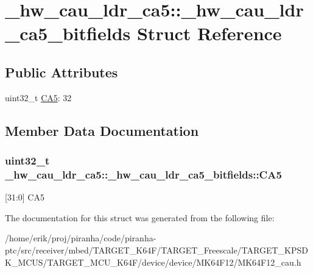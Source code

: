 \hypertarget{struct__hw__cau__ldr__ca5_1_1__hw__cau__ldr__ca5__bitfields}{}\section{\+\_\+hw\+\_\+cau\+\_\+ldr\+\_\+ca5\+:\+:\+\_\+hw\+\_\+cau\+\_\+ldr\+\_\+ca5\+\_\+bitfields Struct Reference}
\label{struct__hw__cau__ldr__ca5_1_1__hw__cau__ldr__ca5__bitfields}
\subsection*{Public Attributes}
\begin{DoxyCompactItemize}
\item 
uint32\+\_\+t \hyperlink{struct__hw__cau__ldr__ca5_1_1__hw__cau__ldr__ca5__bitfields_a693d1eab680df0738b7557676e0d1e6a}{C\+A5}\+: 32
\end{DoxyCompactItemize}


\subsection{Member Data Documentation}
\subsubsection[{\texorpdfstring{C\+A5}{CA5}}]{\setlength{\rightskip}{0pt plus 5cm}uint32\+\_\+t \+\_\+hw\+\_\+cau\+\_\+ldr\+\_\+ca5\+::\+\_\+hw\+\_\+cau\+\_\+ldr\+\_\+ca5\+\_\+bitfields\+::\+C\+A5}\hypertarget{struct__hw__cau__ldr__ca5_1_1__hw__cau__ldr__ca5__bitfields_a693d1eab680df0738b7557676e0d1e6a}{}\label{struct__hw__cau__ldr__ca5_1_1__hw__cau__ldr__ca5__bitfields_a693d1eab680df0738b7557676e0d1e6a}
\mbox{[}31\+:0\mbox{]} C\+A5 

The documentation for this struct was generated from the following file\+:\begin{DoxyCompactItemize}
\item 
/home/erik/proj/piranha/code/piranha-\/ptc/src/receiver/mbed/\+T\+A\+R\+G\+E\+T\+\_\+\+K64\+F/\+T\+A\+R\+G\+E\+T\+\_\+\+Freescale/\+T\+A\+R\+G\+E\+T\+\_\+\+K\+P\+S\+D\+K\+\_\+\+M\+C\+U\+S/\+T\+A\+R\+G\+E\+T\+\_\+\+M\+C\+U\+\_\+\+K64\+F/device/device/\+M\+K64\+F12/M\+K64\+F12\+\_\+cau.\+h\end{DoxyCompactItemize}
